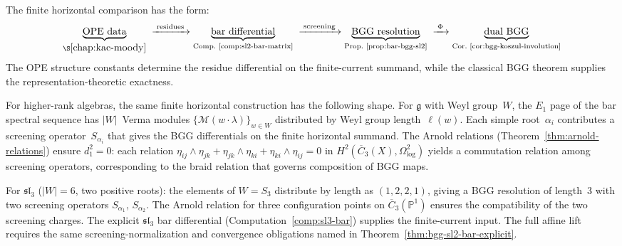 \begin{remark}
\label{rem:bgg-computation}

The finite horizontal comparison has the form:
\[
\underbrace{\text{OPE data}}_{\S\ref{chap:kac-moody}}
\;\xrightarrow{\;\text{residues}\;}
\underbrace{\text{bar differential}}_{\text{Comp.~\ref{comp:sl2-bar-matrix}}}
\;\xrightarrow{\;\text{screening}\;}
\underbrace{\text{BGG resolution}}_{\text{Prop.~\ref{prop:bar-bgg-sl2}}}
\;\xrightarrow{\;\Phi\;}
\underbrace{\text{dual BGG}}_{\text{Cor.~\ref{cor:bgg-koszul-involution}}}
\]
The OPE structure constants determine the residue differential on the
finite-current summand, while the classical BGG theorem supplies the
representation-theoretic exactness.

For higher-rank algebras, the same finite horizontal construction has
the following shape.
For $\mathfrak{g}$ with Weyl group~$W$, the $E_1$ page
of the bar spectral sequence has
$|W|$~Verma modules
$\{\mathcal{M}(w \cdot \lambda)\}_{w \in W}$
distributed by Weyl group length~$\ell(w)$.
Each simple root~$\alpha_i$ contributes a screening
operator~$S_{\alpha_i}$ that gives the BGG differentials on the
finite horizontal summand. The Arnold relations
(Theorem~\ref{thm:arnold-relations}) ensure
$d_1^2 = 0$: each relation
$\eta_{ij} \wedge \eta_{jk} + \eta_{jk} \wedge \eta_{ki}
+ \eta_{ki} \wedge \eta_{ij} = 0$
in $H^2(\overline{C}_3(X), \Omega^2_{\log})$ yields a
commutation relation among screening operators,
corresponding to the braid relation that
governs composition of BGG maps.

For $\mathfrak{sl}_3$ ($|W| = 6$, two positive roots):
the elements of $W = S_3$ distribute by length as
$(1, 2, 2, 1)$, giving a BGG resolution of length~$3$
with two screening operators $S_{\alpha_1}$,
$S_{\alpha_2}$. The Arnold relation for three
configuration points on $\overline{C}_3(\mathbb{P}^1)$
ensures the compatibility of the two screening charges.
The explicit $\mathfrak{sl}_3$ bar differential
(Computation~\ref{comp:sl3-bar}) supplies the finite-current input.
The full affine lift requires the same screening-normalization and
convergence obligations named in Theorem~\ref{thm:bgg-sl2-bar-explicit}.
\end{remark}

